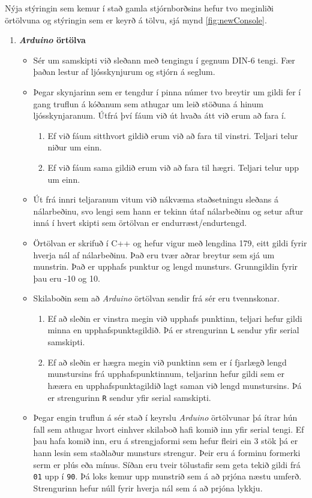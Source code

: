 Nýja stýringin sem kemur í stað gamla stjórnborðsins hefur tvo meginliði örtölvuna og stýringin sem er keyrð á tölvu, sjá mynd \ref{fig:newConsole}. 
\begin{enumerate}
    \item \textbf{\textit{Arduino} örtölva} \begin{itemize}
        \item Sér um samskipti við sleðann með tengingu í gegnum DIN-6 tengi. Fær þaðan lestur af ljósskynjurum og stjórn á seglum. 
        \item Þegar skynjarinn sem er tengdur í pinna númer tvo breytir um gildi fer í gang truflun á kóðanum sem athugar um leið stöðuna á hinum ljósskynjaranum. Útfrá því fáum við út hvaða átt við erum að fara í. \begin{enumerate}
            \item Ef við fáum sitthvort gildið erum við að fara til vinstri. Teljari telur niður um einn.
            \item Ef við fáum sama gildið erum við að fara til hægri. Teljari telur upp um einn.
        \end{enumerate}
        \item Út frá innri teljaranum vitum við nákvæma staðsetningu sleðans á nálarbeðinu, svo lengi sem hann er tekinn útaf nálarbeðinu og setur aftur inná í hvert skipti sem örtölvan er endurræst/endurtengd.
        \item Örtölvan er skrifuð í C++ og hefur vigur með lengdina 179, eitt gildi fyrir hverja nál af nálarbeðinu. Það eru tvær aðrar breytur sem sjá um munstrin. Það er upphafs punktur og lengd munsturs. Grunngildin fyrir þau eru -10 og 10.
        \item Skilaboðin sem að \textit{Arduino} örtölvan sendir frá sér eru tvennskonar.
        \begin{enumerate}
            \item Ef að sleðin er vinstra megin við upphafs punktinn, teljari hefur gildi minna en upphafspunktsgildið. Þá er strengurinn \texttt{L} sendur yfir serial samskipti. 
            \item Ef að sleðin er hægra megin við punktinn sem er í fjarlægð lengd munstursins frá upphafspunktinnum, teljarinn hefur gildi sem er hææra en upphafspunktagildið lagt saman við lengd munstursins. Þá er strengurinn \texttt{R} sendur yfir serial samskipti.
        \end{enumerate}
        \item Þegar engin truflun á sér stað í keyrslu \textit{Arduino} örtölvunar þá ítrar hún fall sem athugar hvort einhver skilaboð hafi komið inn yfir serial tengi. Ef þau hafa komið inn, eru á strengjaformi sem hefur fleiri ein 3 stök þá er hann lesin sem staðlaður munsturs strengur. Þeir eru á forminu formerki serm er plús eða mínus. Síðan eru tveir tölustafir sem geta tekið gildi frá \texttt{01} upp í \texttt{90}. Þá loks kemur upp munstrið sem á að prjóna næstu umferð. Strengurinn hefur núll fyrir hverja nál sem á að prjóna lykkju.

\end{itemize}
\end{enumerate}
